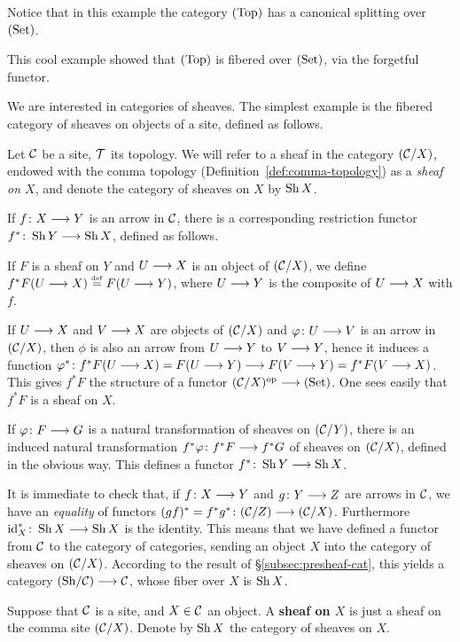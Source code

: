 \begin{3   FIBERED CATEGORIES}
\begin{3.2 Examples of fibered categories}
\begin{example}
Notice that in this example the category $(\mathrm{Top})$ has a canonical splitting over $(\mathrm{Set})$.
\begin{shaded}
This cool example showed that $(\mathrm{Top})$ is fibered over $(\mathrm{Set})$, via the forgetful functor.
\end{shaded}

\end{example}

We are interested in categories of sheaves. The simplest example is the fibered category of sheaves on objects of a site, defined as follows.



\begin{example}\label{ex:fibered-sheaves}
Let $\mathcal{C}$ be a site, $\mathcal{T}$ its topology. We will refer to a sheaf in the category $(\mathcal{C}/X)$, endowed with the comma topology (Definition~\ref{def:comma-topology}) as a \emph{sheaf on $X$}, and denote the category of sheaves on $X$ by $\operatorname{Sh}{X}$.


If $f \colon X \arr Y$ is an arrow in $\mathcal{C}$, there is a corresponding restriction functor $f^* \colon \sh{Y} \arr \sh{X}$, defined as follows.

If $F$ is a sheaf on $Y$ and $U \arr X$ is an object of $(\mathcal{C}/X)$, we define $f^*F(U \arr X) \eqdef F(U \arr Y)$, where $U \arr Y$ is the composite of $U \arr X$ with $f$.

If $U \arr X$ and $V \arr X$ are objects of $(\mathcal{C}/X)$ and $\phi \colon U \arr V$ is an arrow in $(\mathcal{C}/X)$, then $\phi$ is also an arrow from $U \arr Y$ to $V \arr Y$, hence it induces a function $\phi^* \colon f^*F(U \arr X) = F(U \arr Y) \arr F(V \arr Y) = f^*F(V \arr X)$. This gives $f^*F$ the structure of a functor $(\cC/X)\op \arr \catset$. One sees easily that $f^*F$ is a sheaf on $X$.

If $\phi \colon F \arr G$ is a natural transformation of sheaves on $(\mathcal{C}/Y)$, there is an induced natural transformation $f^*\phi \colon f^*F \arr f^*G$ of sheaves on $(\mathcal{C}/X)$, defined in the obvious way. This defines a functor $f^* \colon \sh Y \arr \sh X$.

It is immediate to check that, if $f \colon X \arr Y$ and $g \colon Y \arr Z$ are arrows in $\mathcal{C}$, we have an \emph{equality} of functors $(gf)^* = f^*g^* \colon (\cC/Z) \arr (\cC/X)$. Furthermore $\id_X^* \colon \sh X \arr \sh X$ is the identity. This means that we have defined a functor from $\mathcal{C}$ to the category of categories, sending an object $X$ into the category of sheaves on $(\mathcal{C}/X)$. According to the result of \S\ref{subsec:presheaf-cat}, this yields a category $\catsh{\cC} \arr \cC$, whose fiber over $X$ is $\operatorname{Sh}{X}$.
\begin{shaded}
Suppose that $\mathcal{C}$ is a site, and $X\in\mathcal{C}$ an object. A \textbf{sheaf on $X$} is just a sheaf on the comma site $(\mathcal{C}/X)$.
Denote by $\operatorname{Sh}{X}$ the category of sheaves on $X$.


\end{shaded}
\end{example}
\end{3.2 Examples of fibered categories}
\end{3   FIBERED CATEGORIES}

